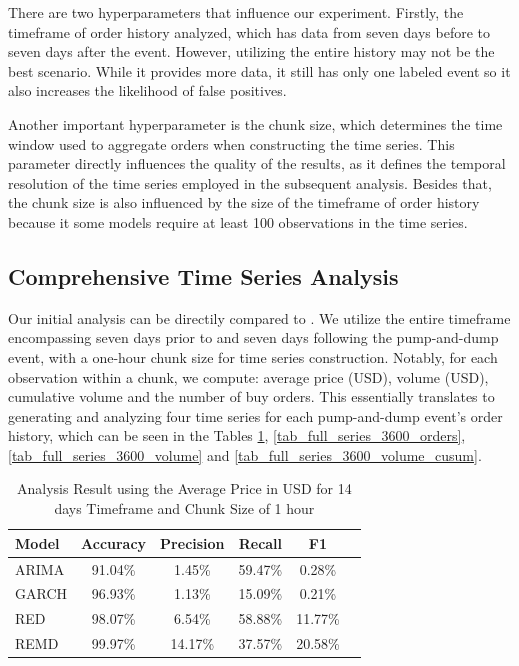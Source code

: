 \documentclass[12pt]{article}
\begin{document}
	There are two hyperparameters that influence our experiment.
	Firstly, the timeframe of order history analyzed, which has data from seven days before to seven days after the event.
	However, utilizing the entire history may not be the best scenario.
	While it provides more data, it still has only one labeled event so it also increases the likelihood of false positives.

	Another important hyperparameter is the chunk size, which determines the time window used to aggregate orders when constructing the time series.
	This parameter directly influences the quality of the results, as it defines the temporal resolution of the time series employed in the subsequent analysis.
	Besides that, the chunk size is also influenced by the size of the timeframe of order history because it some models require at least 100 observations in the time series.

	\subsection{Comprehensive Time Series Analysis}
	\label{subsec_result_series_evals}
	
	Our initial analysis can be directily compared to \citet{kamps2018}.
	We utilize the entire timeframe encompassing seven days prior to and seven days following the pump-and-dump event, with a one-hour chunk size for time series construction.
	Notably, for each observation within a chunk, we compute: average price (USD), volume (USD), cumulative volume and the number of buy orders.
	This essentially translates to generating and analyzing four time series for each pump-and-dump event's order history, which can be seen in the Tables \ref{tab_full_series_3600_price}, \ref{tab_full_series_3600_orders}, \ref{tab_full_series_3600_volume} and \ref{tab_full_series_3600_volume_cusum}.

	\begin{table}[!ht]
        \centering
        \caption{Analysis Result using the Average Price in USD for 14 days Timeframe and Chunk Size of 1 hour}
        \begin{tabular}{lccccc}
            \toprule
            \textbf{Model} & \textbf{Accuracy} & \textbf{Precision} & \textbf{Recall} & \textbf{F1} \\
            \midrule
            ARIMA & 91.04\% & 1.45\% & 59.47\% & 0.28\% \\
            GARCH & 96.93\% & 1.13\% & 15.09\% & 0.21\% \\
            RED & 98.07\% & 6.54\% & 58.88\% & 11.77\% \\
			REMD & 99.97\% & 14.17\% & 37.57\% & 20.58\% \\
            \bottomrule
        \end{tabular}
        \label{tab_full_series_3600_price}
    \end{table}
\end{document}
